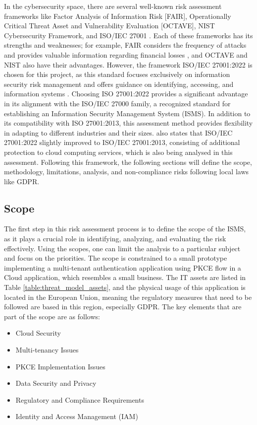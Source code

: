 In the cybersecurity space, there are several well-known risk assessment frameworks like Factor Analysis of Information Risk [FAIR], Operationally Critical Threat Asset and Vulnerability Evaluation [OCTAVE], NIST Cybersecurity Framework, and ISO/IEC 27001 \citep{cybersec_risk_frameworks}. Each of these frameworks has its strengths and weaknesses; for example, FAIR considers the frequency of attacks and provides valuable information regarding financial losses \citep{fair_bn}, and OCTAVE and NIST also have their advantages. However, the framework ISO/IEC 27001:2022 is chosen for this project, as this standard focuses exclusively on information security risk management and offers guidance on identifying, accessing, and information systems \citep{iso}. Choosing ISO 27001:2022 provides a significant advantage in its alignment with the ISO/IEC 27000 family, a recognized standard for establishing an Information Security Management System (ISMS). In addition to its compatibility with ISO 27001:2013, this assessment method provides flexibility in adapting to different industries and their sizes. \cite{iso_2700:2022} also states that ISO/IEC 27001:2022 slightly improved to ISO/IEC 27001:2013, consisting of additional protection to cloud computing services, which is also being analysed in this assessment. Following this framework, the following sections will define the scope, methodology, limitations, analysis, and non-compliance risks following local laws like GDPR. 


\subsection{Scope}
The first step in this risk assessment process is to define the scope of the ISMS, as it plays a crucial role in identifying, analyzing, and evaluating the risk effectively. Using the scopes, one can limit the analysis to a particular subject and focus on the priorities. The scope is constrained to a small prototype implementing a multi-tenant authentication application using PKCE flow in a Cloud application, which resembles a small business. The IT assets are listed in Table \ref{table:threat_model_assets}, and the physical usage of this application is located in the European Union, meaning the regulatory measures that need to be followed are based in this region, especially GDPR. The key elements that are part of the scope are as follows:
\begin{itemize}
    \item Cloud Security
    \item Multi-tenancy Issues
    \item PKCE Implementation Issues
    \item Data Security and Privacy
    \item Regulatory and Compliance Requirements
    \item Identity and Access Management (IAM)
\end{itemize}

